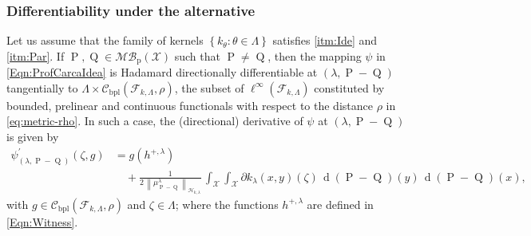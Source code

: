 		\subsubsection*{\color{orange} Differentiability under the alternative}
			\begin{Th}
				Let us assume that the family of kernels $\left\{k_{\theta}:\theta\in\Lambda\right\}$ satisfies \ref{itm:Ide} and \ref{itm:Par}. If $\operatorname{P},\operatorname{Q}\in\mathcal{MB}_{\operatorname{p}}(\mathcal{X})$ such that $\operatorname{P}\neq\operatorname{Q}$, then the mapping $\psi$ in \eqref{Eqn:ProfCarcaIdea} is Hadamard directionally differentiable at $(\lambda,\operatorname{P}-\operatorname{Q})$ tangentially to $\Lambda\times\mathcal{C}_{\operatorname{bpl}}\left(\mathcal{F}_{k,\Lambda},\rho\right)$,
				{\color{orange}the subset of $\ell^{\infty}\left(\mathcal{F}_{k,\Lambda}\right)$ constituted by bounded, prelinear and continuous functionals with respect to the distance $\rho$ in \eqref{eq:metric-rho}}. In such a case, the (directional) derivative of $\psi$ at $(\lambda,\operatorname{P}-\operatorname{Q})$ is given by
				\begin{equation}\label{Eqn:psi_prime1}
					\begin{aligned}
						\psi_{(\lambda,\operatorname{P}-\operatorname{Q})}^{\prime}(\zeta,g)&=g\left(h^{+,\lambda}\right)
						\\
						&\quad+\frac{1}{2\,\left\|\mu_{\operatorname{P}-\operatorname{Q}}^{\lambda}\right\|_{\mathcal{H}_{k,\lambda}}}\,\int_{\mathcal{X}}\int_{\mathcal{X}}\partial k_{\lambda}(x,y)(\zeta)\,\operatorname{d}(\operatorname{P}-\operatorname{Q})(y)\,\operatorname{d}(\operatorname{P}-\operatorname{Q})(x),
					\end{aligned}
				\end{equation}
				with $g\in\mathcal{C}_{\operatorname{bpl}}\left(\mathcal{F}_{k,\Lambda},\rho\right)$ and $\zeta\in\Lambda$; where the functions $h^{+,\lambda}$ are defined in \eqref{Eqn:Witness}.
			\end{Th}
